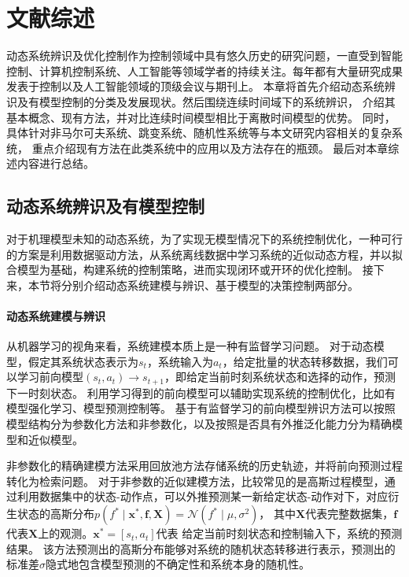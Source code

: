 \chapter{文献综述}
动态系统辨识及优化控制作为控制领域中具有悠久历史的研究问题，一直受到智能控制、计算机控制系统、人工智能等领域学者的持续关注。每年都有大量研究成果发表于控制以及人工智能领域的顶级会议与期刊上。
本章将首先介绍动态系统辨识及有模型控制的分类及发展现状。然后围绕连续时间域下的系统辨识，
介绍其基本概念、现有方法，并对比连续时间模型相比于离散时间模型的优势。
同时，具体针对非马尔可夫系统、跳变系统、随机性系统等与本文研究内容相关的复杂系统，
重点介绍现有方法在此类系统中的应用以及方法存在的瓶颈。
最后对本章综述内容进行总结。
\section{动态系统辨识及有模型控制}
\label{sec:2_1}
对于机理模型未知的动态系统，为了实现无模型情况下的系统控制优化，一种可行的方案是利用数据驱动方法，从系统离线数据中学习系统的近似动态方程，并以拟合模型为基础，构建系统的控制策略，进而实现闭环或开环的优化控制。
接下来，本节将分别介绍动态系统建模与辨识、基于模型的决策控制两部分。


\subsubsection{动态系统建模与辨识}
从机器学习的视角来看，系统建模本质上是一种有监督学习问题\cite{jordan1992forward}。
对于动态模型，假定其系统状态表示为$s_t$，系统输入为$a_t$，给定批量的状态转移数据，我们可以学习前向模型$\left(s_t, a_t\right) \rightarrow s_{t+1}$，即给定当前时刻系统状态和选择的动作，预测下一时刻状态。
利用学习得到的前向模型可以辅助实现系统的控制优化，比如有模型强化学习、模型预测控制等\cite{moerland2020model}。
基于有监督学习的前向模型辨识方法可以按照模型结构分为参数化方法和非参数化，以及按照是否具有外推泛化能力分为精确模型和近似模型。

非参数化的精确建模方法采用回放池\cite{lin1992memory}方法存储系统的历史轨迹，并将前向预测过程转化为检索问题。
对于非参数的近似建模方法，比较常见的是高斯过程模型\cite{deisenroth2011pilco,deisenroth2011pilco}，通过利用数据集中的状态-动作点，可以外推预测某一新给定状态-动作对下，对应衍生状态的高斯分布$p\left(f^* \mid \boldsymbol{x}^*, \boldsymbol{f}, \boldsymbol{X}\right)=\mathcal{N}\left(f^* \mid \mu, \sigma^2\right)$，
其中$\boldsymbol{X}$代表完整数据集，$\boldsymbol{f}$代表$\boldsymbol{X}$上的观测。$\boldsymbol{x}^*=[s_t,a_t]$代表
给定当前时刻状态和控制输入下，系统的预测结果。
该方法预测出的高斯分布能够对系统的随机状态转移进行表示，预测出的标准差$\sigma$隐式地包含模型预测的不确定性和系统本身的随机性。

